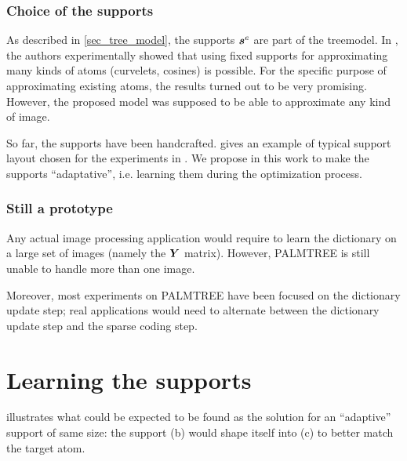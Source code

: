 \subsubsection{Choice of the supports}

As described in \cref{sec_tree_model}, the supports $\bm{s}^e$ are part of the \gls{treemodel}. In \cite{chabiron_toward_2015}, the authors experimentally showed that using fixed supports for approximating many kinds of atoms (curvelets, cosines) is possible. For the specific purpose of approximating existing atoms, the results turned out to be very promising. However, the proposed model was supposed to be able to approximate any kind of image.

So far, the supports have been handcrafted.  gives an example of typical support layout chosen for the experiments in \cite{chabiron_optimization_2016}. We propose in this work to make the supports “adaptative”, i.e. learning them during the optimization process.

\subsubsection{Still a prototype}
Any actual image processing application would require to learn the dictionary on a large set of images (namely the $\bm{Y}$ matrix). However, \ac{PALMTREE} is still unable to handle more than one image.

Moreover, most experiments on \ac{PALMTREE} have been focused on the dictionary update step; real applications would need to alternate between the dictionary update step and the sparse coding step.


\section{Learning the supports}

 illustrates what could be expected to be found as the solution for an “adaptive” support of same size: the support (b) would shape itself into (c) to better match the target atom.


